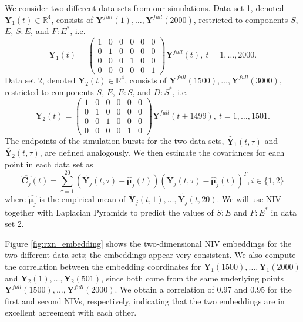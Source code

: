 \documentclass[aip,jcp,reprint,twocolumn]{revtex4-1}
\begin{document}
We consider two different data sets from our simulations.
%
Data set 1, denoted $\mathbf{Y}_1(t) \in \mathbb{R}^4$, consists of $\mathbf{Y}^{full}(1), \dots, \mathbf{Y}^{full}(2000)$, restricted to components $S$, $E$, $S:E$, and $F:E^{*}$, i.e.
$$\mathbf{Y}_1(t) =
\left( \begin{array}{cccccc}
1 & 0 & 0 & 0 & 0 & 0 \\
0 & 1 & 0 & 0 & 0 & 0 \\
0 & 0 & 0 & 1 & 0 & 0 \\
0 & 0 & 0 & 0 & 0 & 1
\end{array} \right) \mathbf{Y}^{full}(t), \: t=1, \dots, 2000.$$
%
Data set 2, denoted $\mathbf{Y}_2(t) \in \mathbb{R}^4$, consists of $\mathbf{Y}^{full}(1500), \dots, \mathbf{Y}^{full}(3000)$, restricted to components $S$, $E$, $E:S$, and $D:S^{*}$, i.e.
$$\mathbf{Y}_2(t) =
\left( \begin{array}{cccccc}
1 & 0 & 0 & 0 & 0 & 0 \\
0 & 1 & 0 & 0 & 0 & 0 \\
0 & 0 & 1 & 0 & 0 & 0 \\
0 & 0 & 0 & 0 & 1 & 0
\end{array} \right)
\mathbf{Y}^{full}(t + 1499), \: t=1, \dots, 1501.$$
%
The endpoints of the simulation bursts for the two data sets, $\widetilde{\mathbf{Y}_1}(t, \tau)$ and $\widetilde{\mathbf{Y}_2}(t, \tau)$, are defined analogously.
%
We then estimate the covariances for each point in each data set as
\begin{equation}
\widehat{\mathbf{C}_j}(t) = \sum_{\tau=1}^{20} \left( \widetilde{\mathbf{Y}_j}(t, \tau) - \hat{\mathbf{\mu}}_j(t) \right)\left( \widetilde{\mathbf{Y}_j}(t, \tau) - \hat{\mathbf{\mu}}_j(t) \right)^T, i \in \{1, 2\}
\end{equation}
where $\hat{\mathbf{\mu}_j}$ is the empirical mean of $\widetilde{\mathbf{Y}_j}(t, 1), \dots, \widetilde{\mathbf{Y}_j}(t, 20)$.
%
We will use NIV together with Laplacian Pyramids to predict the values of $S:E$ and $F:E^{*}$ in data set 2.

Figure \ref{fig:rxn_embedding} shows the two-dimensional NIV embeddings for the two different data sets; the embeddings appear very consistent.
%
We also compute the correlation between the embedding coordinates for $\mathbf{Y}_1(1500), \dots, \mathbf{Y}_1(2000)$ and $\mathbf{Y}_2(1), \dots, \mathbf{Y}_2(501)$,
since both come from the same underlying points $\mathbf{Y}^{full}(1500), \dots, \mathbf{Y}^{full}(2000)$.
%
We obtain a correlation of 0.97 and 0.95 for the first and second NIVs, respectively, indicating that the two embeddings are in excellent agreement with each other.
\end{document}
